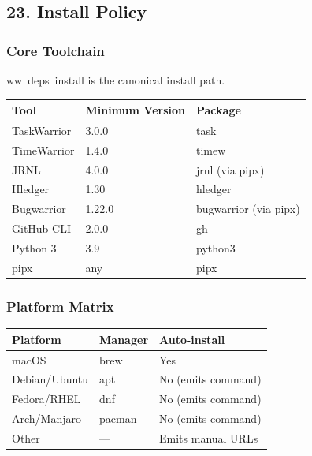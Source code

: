 \documentclass[11pt, a4paper, DIV=14]{scrartcl}
\renewcommand{\texttt}[1]{{\ttfamily\fontsize{8.5}{10.5}\selectfont\color{BabbNavy}#1}}
\begin{document}
\subsection{23. Install Policy}\label{install-policy}

\subsubsection{Core Toolchain}\label{core-toolchain}

\texttt{ww\ deps\ install} is the canonical install path.

{\def\LTcaptype{none} %
\begin{longtable}[]{@{}lll@{}}
\toprule\noalign{}
Tool & Minimum Version & Package \\
\midrule\noalign{}
\endhead
\bottomrule\noalign{}
\endlastfoot
TaskWarrior & 3.0.0 & \texttt{task} \\
TimeWarrior & 1.4.0 & \texttt{timew} \\
JRNL & 4.0.0 & \texttt{jrnl} (via pipx) \\
Hledger & 1.30 & \texttt{hledger} \\
Bugwarrior & 1.22.0 & \texttt{bugwarrior} (via pipx) \\
GitHub CLI & 2.0.0 & \texttt{gh} \\
Python 3 & 3.9 & \texttt{python3} \\
pipx & any & \texttt{pipx} \\
\end{longtable}
}

\subsubsection{Platform Matrix}\label{platform-matrix}

{\def\LTcaptype{none} %
\begin{longtable}[]{@{}lll@{}}
\toprule\noalign{}
Platform & Manager & Auto-install \\
\midrule\noalign{}
\endhead
\bottomrule\noalign{}
\endlastfoot
macOS & brew & Yes \\
Debian/Ubuntu & apt & No (emits command) \\
Fedora/RHEL & dnf & No (emits command) \\
Arch/Manjaro & pacman & No (emits command) \\
Other & --- & Emits manual URLs \\
\end{longtable}
}
\end{document}
